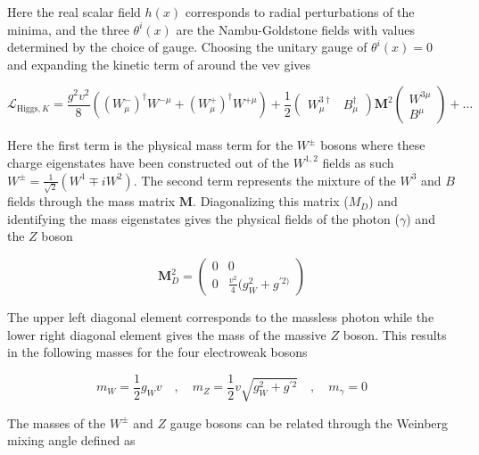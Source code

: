 Here the real scalar field $h(x)$ corresponds to radial perturbations of the
minima, and the three $\theta^{i}(x)$ are the Nambu-Goldstone fields with
values determined by the choice of gauge.  Choosing the unitary gauge of
$\theta^{i}(x) = 0$ and expanding the kinetic term of
 around the vev gives

\begin{equation} \label{eq:higgs:boson_masses}
\mathcal{L}_{\text{Higgs},K} = \frac{g^{2}v^{2}}{8} \left(
(W_{\mu}^{-})^{\dagger}W^{-\mu} + (W_{\mu}^{+})^{\dagger}W^{+\mu} \right) +
\frac{1}{2} \left( \begin{matrix} W_{\mu}^{3\dagger} & B_{\mu}^{\dagger}
\end{matrix} \right) \boldsymbol{M}^{2} \left( \begin{matrix} W^{3\mu} \\ B^{\mu}
\end{matrix} \right) + \ldots 
\end{equation}

Here the first term is the physical mass term for the $W^{\pm}$ bosons where
these charge eigenstates have been constructed out of the $W^{1,2}$ fields as
such $W^{\pm} = \frac{1}{\sqrt{2}}(W^{1} \mp iW^{2})$.  The second term
represents the mixture of the $W^{3}$ and $B$ fields through the mass matrix
$\boldsymbol{M}$.  Diagonalizing this matrix ($M_{D}$) and identifying the mass
eigenstates gives the physical fields of the photon ($\gamma$) and the $Z$
boson

\begin{equation}
\boldsymbol{M}_{D}^{2} = \left( \begin{matrix} 0 & 0 \\ 0 &
\frac{v^{2}}{4}(g_{W}^{2} + g^{'2)}   \end{matrix} \right)
\end{equation}

The upper left diagonal element corresponds to the massless photon
while the lower right diagonal element gives the mass of the massive $Z$ boson.
This results in the following masses for the four electroweak bosons

\begin{equation}
m_{W} = \frac{1}{2}g_{W}v \quad , \quad m_Z = \frac{1}{2}v\sqrt{g_{W}^{2} + g^{'2}}
\quad , \quad m_\gamma = 0
\end{equation}

The masses of the $W^{\pm}$ and $Z$ gauge bosons can be related through the
Weinberg mixing angle defined as

